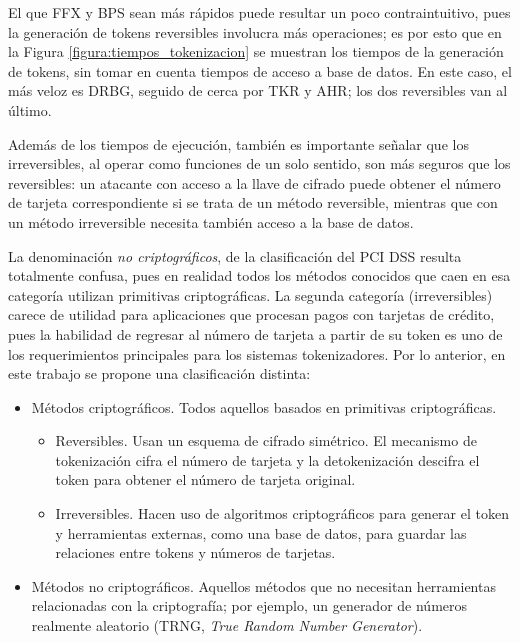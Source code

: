 \documentclass[conference]{IEEEtran}
\begin{document}
  El que FFX y BPS sean más rápidos puede resultar un poco contraintuitivo, pues
  la generación de tokens reversibles involucra más operaciones; es por esto que
  en la Figura \ref{figura:tiempos_tokenizacion} se muestran los tiempos de la
  generación de tokens, sin tomar en cuenta tiempos de acceso a base de datos.
  En este caso, el más veloz es DRBG, seguido de cerca por TKR y AHR; los dos
  reversibles van al último.

  Además de los tiempos de ejecución, también es importante señalar que los
  irreversibles, al operar como funciones de un solo sentido, son más seguros
  que los reversibles: un atacante con acceso a la llave de cifrado puede
  obtener el número de tarjeta correspondiente si se trata de un método
  reversible, mientras que con un método irreversible necesita también acceso a
  la base de datos.

  La denominación \textit{no criptográficos}, de la clasificación del PCI DSS
  resulta totalmente confusa, pues en realidad todos los métodos conocidos que
  caen en esa categoría utilizan primitivas criptográficas. La segunda categoría
  (irreversibles) carece de utilidad para aplicaciones que procesan pagos con
  tarjetas de crédito, pues la habilidad de regresar al número de tarjeta a
  partir de su token es uno de los requerimientos principales para los sistemas
  tokenizadores. Por lo anterior, en este trabajo se propone una clasificación
  distinta:

  \begin{itemize}
    \item Métodos criptográficos. Todos aquellos basados en primitivas
      criptográficas.
      \begin{itemize}
        \item Reversibles. Usan un esquema de cifrado simétrico. El mecanismo de
          tokenización cifra el número de tarjeta y la detokenización descifra el
          token para obtener el número de tarjeta original.
        \item Irreversibles. Hacen uso de algoritmos criptográficos para generar
          el token y herramientas externas, como una base de datos, para guardar
          las relaciones entre tokens y números de tarjetas.
      \end{itemize}
    \item Métodos no criptográficos. Aquellos métodos que no necesitan
      herramientas relacionadas con la criptografía; por ejemplo, un generador
      de números realmente aleatorio (TRNG, \textit{True Random Number
      Generator}).
  \end{itemize}
\end{document}
